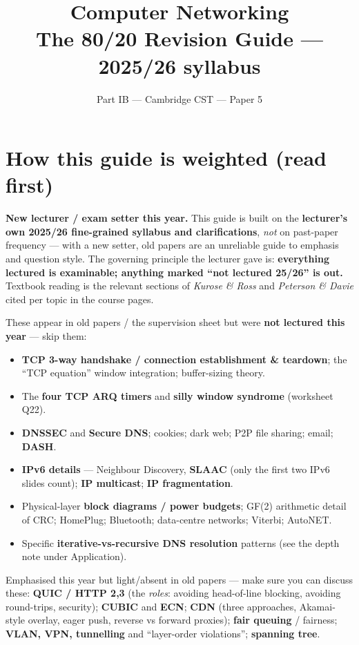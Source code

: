 \documentclass[11pt,a4paper]{article}
\title{\vspace{-1.5cm}\textbf{Computer Networking} \\[2pt] \large The 80/20 Revision Guide --- 2025/26 syllabus}
\author{\small Part IB --- Cambridge CST --- Paper 5}
\date{}
\begin{document}
\maketitle
\vspace{-0.8cm}

\section*{How this guide is weighted (read first)}

\textbf{New lecturer / exam setter this year.} This guide is built on the \textbf{lecturer's own 2025/26 fine-grained syllabus and clarifications}, \emph{not} on past-paper frequency --- with a new setter, old papers are an unreliable guide to emphasis and question style. The governing principle the lecturer gave is: \textbf{everything lectured is examinable; anything marked ``not lectured 25/26'' is out.} Textbook reading is the relevant sections of \emph{Kurose \& Ross} and \emph{Peterson \& Davie} cited per topic in the course pages.

\begin{out}
These appear in old papers / the supervision sheet but were \textbf{not lectured this year} --- skip them:
\begin{itemize}[leftmargin=*,itemsep=0pt]
  \item \textbf{TCP 3-way handshake / connection establishment \& teardown}; the ``TCP equation'' window integration; buffer-sizing theory.
  \item The \textbf{four TCP ARQ timers} and \textbf{silly window syndrome} (worksheet Q22).
  \item \textbf{DNSSEC} and \textbf{Secure DNS}; cookies; dark web; P2P file sharing; email; \textbf{DASH}.
  \item \textbf{IPv6 details} --- Neighbour Discovery, \textbf{SLAAC} (only the first two IPv6 slides count); \textbf{IP multicast}; \textbf{IP fragmentation}.
  \item Physical-layer \textbf{block diagrams / power budgets}; GF(2) arithmetic detail of CRC; HomePlug; Bluetooth; data-centre networks; Viterbi; AutoNET.
  \item Specific \textbf{iterative-vs-recursive DNS resolution} patterns (see the depth note under Application).
\end{itemize}
\end{out}

\begin{newm}
Emphasised this year but light/absent in old papers --- make sure you can discuss these:
\textbf{QUIC / HTTP 2,3} (the \emph{roles}: avoiding head-of-line blocking, avoiding round-trips, security); \textbf{CUBIC} and \textbf{ECN}; \textbf{CDN} (three approaches, Akamai-style overlay, eager push, reverse vs forward proxies); \textbf{fair queuing} / fairness; \textbf{VLAN, VPN, tunnelling} and ``layer-order violations''; \textbf{spanning tree}.
\end{newm}
\end{document}
